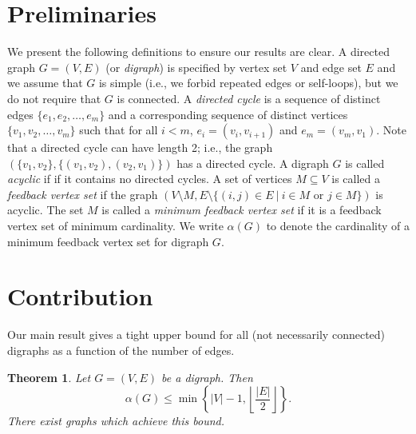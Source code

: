 \documentclass[onecolumn]{IEEETran}
\newtheorem{theorem}{Theorem}
\begin{document}
\section{Preliminaries}
We present the following definitions to ensure our results are clear.
A directed graph $G=(V,E)$ (or \emph{digraph}) is specified by vertex set $V$ and edge set $E$ and we assume that $G$ is simple (i.e., we forbid repeated edges or self-loops), but we do not require that $G$ is connected.
A \emph{directed cycle} is a sequence of distinct edges $\{e_1,e_2,\ldots,e_m\}$ and a corresponding sequence of distinct vertices $\{v_1,v_2,\ldots,v_m\}$ such that for all $i<m$, $e_i=(v_i,v_{i+1})$ and $e_m=(v_m,v_1)$.
Note that a directed cycle can have length 2; i.e., the graph $(\{v_1,v_2\},\{(v_1,v_2),(v_2,v_1)\})$ has a directed cycle.
A digraph $G$ is called \emph{acyclic} if if it contains no directed cycles.
A set of vertices $M\subseteq V$ is called a \emph{feedback vertex set} if the graph $\left(V\setminus M,E\setminus \{(i,j)\in E\ |\ i\in M \mbox{ or } j\in M\}\right)$ is acyclic.
The set $M$ is called a \emph{minimum feedback vertex set} if it is a feedback vertex set of minimum cardinality. 
We write $\alpha(G)$ to denote the cardinality of a minimum feedback vertex set for digraph $G$.

\section{Contribution}


Our main result gives a tight upper bound for all (not necessarily connected) digraphs as a function of the number of edges.
\begin{theorem}\label{thm:main}
Let $G=(V,E)$ be a digraph.
Then
\begin{equation}\label{eq:main}
\alpha(G) \leq \min\left\{|V|-1,\left\lfloor\frac{|E|}{2}\right\rfloor\right\}.
\end{equation}
There exist graphs which achieve this bound.
\end{theorem}
\end{document}
